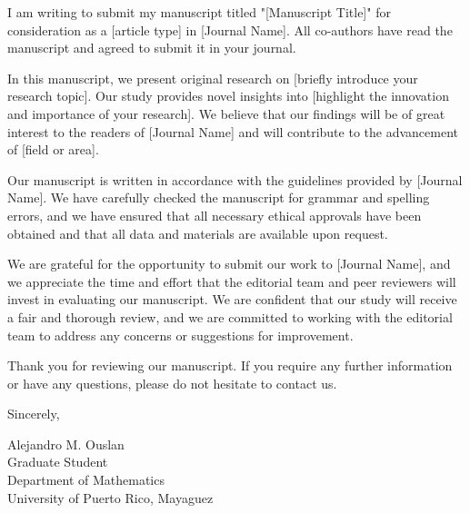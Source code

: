 \documentclass{article}
\begin{document}
I am writing to submit my manuscript titled "[Manuscript Title]" for consideration as a [article type] in [Journal Name]. All co-authors have read the manuscript and agreed to submit it in your journal.

In this manuscript, we present original research on [briefly introduce your research topic]. Our study provides novel insights into [highlight the innovation and importance of your research]. We believe that our findings will be of great interest to the readers of [Journal Name] and will contribute to the advancement of [field or area].

Our manuscript is written in accordance with the guidelines provided by [Journal Name]. We have carefully checked the manuscript for grammar and spelling errors, and we have ensured that all necessary ethical approvals have been obtained and that all data and materials are available upon request.

We are grateful for the opportunity to submit our work to [Journal Name], and we appreciate the time and effort that the editorial team and peer reviewers will invest in evaluating our manuscript. We are confident that our study will receive a fair and thorough review, and we are committed to working with the editorial team to address any concerns or suggestions for improvement.

Thank you for reviewing our manuscript. If you require any further information or have any questions, please do not hesitate to contact us.

\bigskip %

Sincerely,

\vspace{20pt} %



Alejandro M. Ouslan \\
Graduate Student \\
Department of Mathematics \\
University of Puerto Rico, Mayaguez
\end{document}
